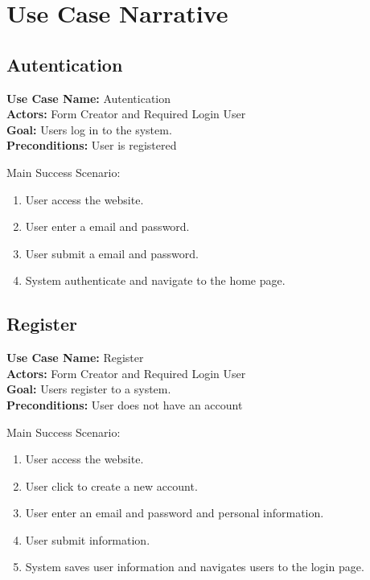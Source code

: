 \documentclass[12pt,oneside,openright,a4paper]{cpe-english-project}
\begin{document}
\section{Use Case Narrative}

\subsection{Autentication}

\noindent\textbf{Use Case Name:} Autentication \\
\textbf{Actors:} Form Creator and Required Login User \\
\textbf{Goal:} Users log in to the system. \\
\textbf{Preconditions:} User is registered

Main Success Scenario: 

\begin{enumerate}
    \item User access the website.
    \item User enter a email and password.
    \item User submit a email and password.
    \item System authenticate and navigate to the home page.
\end{enumerate}

\newpage

\subsection{Register}

\noindent\textbf{Use Case Name:} Register \\
\textbf{Actors:} Form Creator and Required Login User \\
\textbf{Goal:} Users register to a system. \\
\textbf{Preconditions:} User does not have an account

Main Success Scenario: 

\begin{enumerate}
    \item User access the website.
    \item User click to create a new account.
    \item User enter an email and password and personal information.
    \item User submit information.
    \item System saves user information and navigates users to the login page.

\end{enumerate}
\end{document}
